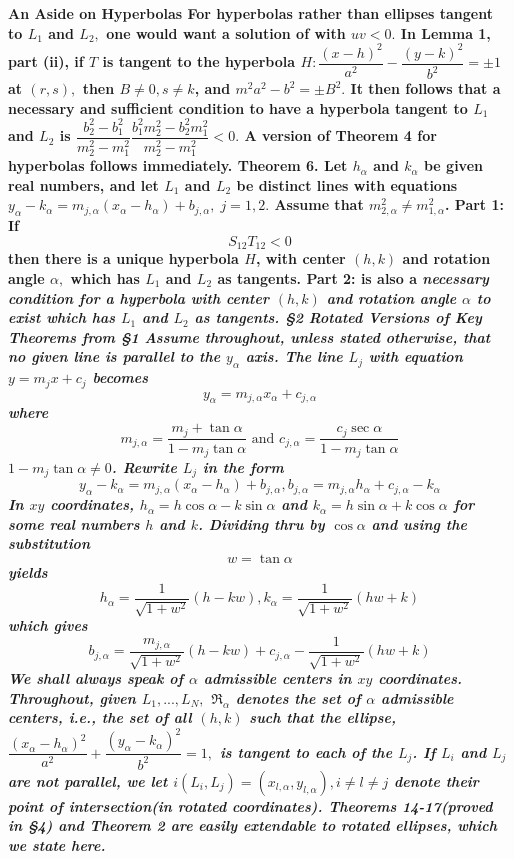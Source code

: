 \nl \nl \bf An Aside on Hyperbolas \rm  \newline 
	For \bf hyperbolas \rm rather than ellipses tangent to $L_{1}$ and $L_{2},$ one would want a solution of  with $uv<0.$ In Lemma 1, part (ii), if $T$ is tangent to the hyperbola $H:\dfrac{(x-h)^{2}}{a^{2}}-\dfrac{(y-k)^{2}}{b^{2}}=\pm 1$ at $(r,s),$ then $B\neq 0,s\neq k$, and $m^{2}a^{2}-b^{2}=\pm B^{2}.$ It then follows that a necessary and sufficient condition to have a hyperbola tangent to $L_{1}$ and $L_{2}$ is $\dfrac{b_{2}^{2}-b_{1}^{2}}{m_{2}^{2}-m_{1}^{2}}\dfrac{b_{1}^{2}m_{2}^{2}-b_{2}^{2}m_{1}^{2}}{m_{2}^{2}-m_{1}^{2}}<0.$ A version of Theorem 4 for hyperbolas follows immediately. \nl \nl 
\bf Theorem 6. \rm  Let $h_\alpha$ and $k_\alpha$ be given real numbers, and let $L_{1}$ and $L_{2}$ be distinct lines with equations $y_{\alpha}-k_{\alpha}=m_{j,\alpha}(x_{\alpha}-h_{\alpha})+b_{j,\alpha},\;j=1,2.$ Assume that $m_{2,\alpha}^{2}\neq m_{1,\alpha }^{2}$. \newline Part 1: If $$S_{12}T_{12}<0\tag{19}$$ then there is a unique hyperbola $H$, with center $(h,k)$ and rotation angle $\alpha,$ which has $L_{1}$ and $L_{2}$ as tangents. \newline Part 2:  is also a \it necessary \rm condition for a hyperbola with center $(h,k)$ and rotation angle $\alpha $ to exist which has $L_{1}$ and $L_{2}$ as tangents. \newline \nl
\bf \S 2 Rotated Versions of Key Theorems from \S 1 \rm \newline 
	Assume throughout, unless stated otherwise, that no given line is parallel to the $y_\alpha$ axis. The line $L_{j}$ with equation $y=m_{j}x+c_{j}$ becomes $$y_{\alpha}=m_{j,\alpha}x_{\alpha}+c_{j,\alpha}\tag{20}$$ where $$m_{j,\alpha}=\dfrac{m_{j}+\tan \alpha}{1-m_{j}\tan \alpha}\text{ and }c_{j,\alpha}=\dfrac{c_{j}\sec \alpha}{1-m_{j}\tan \alpha }\tag{21}$$ $1-m_{j}\tan \alpha \neq 0$. Rewrite $L_{j}$ in the form $$y_{\alpha}-k_{\alpha}=m_{j,\alpha}(x_{\alpha}-h_{\alpha})+b_{j,\alpha}, b_{j,\alpha}=m_{j,\alpha}h_{\alpha}+c_{j,\alpha}-k_{\alpha}\tag{22}$$ In $xy$ coordinates, $h_{\alpha}=h\cos \alpha -k\sin \alpha$ and $k_{\alpha}=h\sin \alpha +k\cos \alpha$ for some real numbers $h$ and $k$. Dividing thru by $\cos \alpha $ and using the substitution $$w=\tan \alpha $$ yields $$h_{\alpha}=\dfrac{1}{\sqrt{1+w^{2}}}(h-kw),k_{\alpha}=\dfrac{1}{\sqrt{1+w^{2}}}(hw+k)\tag{23}$$ which gives $$b_{j,\alpha}=\dfrac{m_{j,\alpha}}{\sqrt{1+w^{2}}}(h-kw)+c_{j,\alpha}-\dfrac{1}{\sqrt{1+w^{2}}}(hw+k)\tag{24}$$ We shall always speak of $\alpha $ admissible centers in $xy$ coordinates. Throughout, given $L_{1},...,L_{N},$ $\Re _{\alpha}$ denotes the set of $\alpha $ admissible centers, i.e., the set of all $(h,k)$ such that the ellipse,$\dfrac{(x_{\alpha}-h_{\alpha})^{2}}{a^{2}}+\dfrac{(y_{\alpha}-k_{\alpha})^{2}}{b^{2}}=1,$ is tangent to each of the $L_{j}$. If $L_{i}$ and $L_{j}$ are not parallel, we let $i(L_{i},L_{j})=(x_{l,\alpha},y_{l,\alpha}),i\neq l\neq j$ denote their point of intersection(in rotated coordinates). Theorems 14-17(proved in \S 4) and Theorem 2  are easily extendable to rotated ellipses, which we state here. \nl \nl
